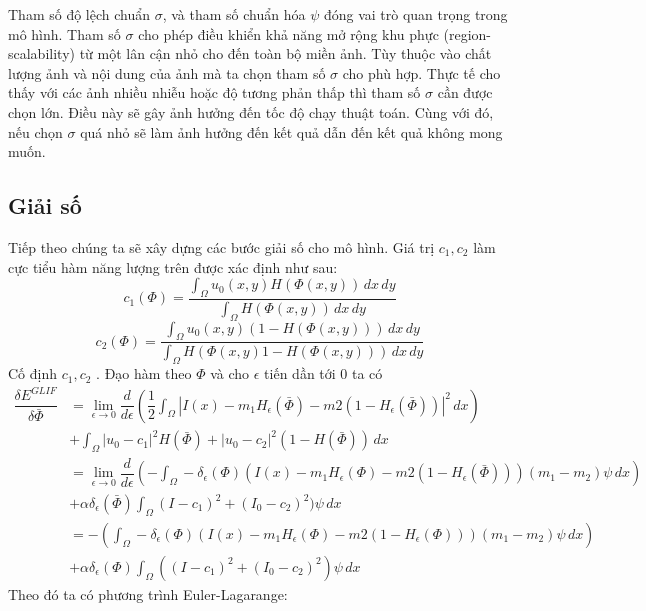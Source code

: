 \documentclass[12pt,oneside,a4]{report}
\begin{document}
Tham số độ lệch chuẩn $\sigma$, và tham số chuẩn hóa $\psi$ đóng vai trò quan trọng trong mô hình.  Tham số $\sigma$ cho phép điều khiển khả năng mở rộng khu phực (region-scalability) từ một lân cận nhỏ cho đến toàn bộ miền ảnh. Tùy thuộc vào chất lượng ảnh và nội dung của ảnh mà ta chọn tham số $\sigma$ cho phù hợp. Thực tế cho thấy với các ảnh nhiều nhiễu hoặc độ tương phản thấp thì tham số $\sigma$ cần được chọn lớn. Điều này sẽ gây  ảnh hưởng đến tốc độ chạy thuật toán. Cùng với đó, nếu chọn $\sigma$ quá nhỏ sẽ làm ảnh hưởng đến kết quả dẫn đến kết quả không mong muốn.
\subsection{Giải số}
Tiếp theo chúng ta sẽ xây dựng các bước giải số cho mô hình. Giá trị $c_1, c_2$ làm cực tiểu hàm năng lượng trên được xác định như sau:
\begin{equation}
c_1(\Phi)=\dfrac{\int_{\Omega}u_0(x,y)H(\Phi(x,y))\,dx \,dy}{\int_{\Omega}H(\Phi(x,y))\,dx\,dy}
\end{equation}
\begin{equation}
c_2(\Phi)=\dfrac{\int_{\Omega}u_0(x,y)(1-H(\Phi(x,y)))\,dx \,dy}{\int_{\Omega}H(\Phi(x,y)1-H(\Phi(x,y)))\,dx\,dy}
\end{equation}
Cố định $c_1, c_2$ . Đạo hàm theo $\Phi$ và cho $\epsilon$ tiến dần tới 0 ta có
\begin{equation}
\begin{split}
\dfrac{\delta E^{GLIF}}{\delta\bar{\Phi} } &=\lim_{\epsilon \rightarrow 0}\dfrac{d}{d \epsilon}(\dfrac{1}{2}\int_{\Omega}|I(x)-m_1H_{\epsilon}(\bar{\Phi})-m2(1-H_{\epsilon}(\bar{\Phi}))|^2\,dx) \\ 
&+\int_{\Omega} |u_0-c_1|^2H(\bar{\Phi})+ |u_0-c_2|^2(1-H(\bar{\Phi})) \,dx\\
&=\lim_{\epsilon \rightarrow 0}\dfrac{d}{d \epsilon}(-\int_{\Omega}-\delta_{\epsilon}(\Phi)(I(x)-m_1H_{\epsilon}(\Phi)-m2(1-H_{\epsilon}(\bar{\Phi})))(m_1-m_2)\psi\,dx) \\ 
&+\alpha\delta_{\epsilon}(\bar{\Phi})\int_{\Omega} (I-c_1)^2+ (I_0-c_2)^2)\psi \,dx\\
&=-(\int_{\Omega}-\delta_{\epsilon}(\Phi)(I(x)-m_1 H_{\epsilon}(\Phi)-m2(1-H_{\epsilon}(\Phi)))(m_1-m_2)\psi\,dx)\\
&+\alpha\delta_{\epsilon}(\Phi)\int_{\Omega} ((I-c_1)^2+ (I_0-c_2)^2)\psi \,dx
\end{split}
\end{equation}
Theo đó ta có phương trình Euler-Lagarange:
\end{document}
